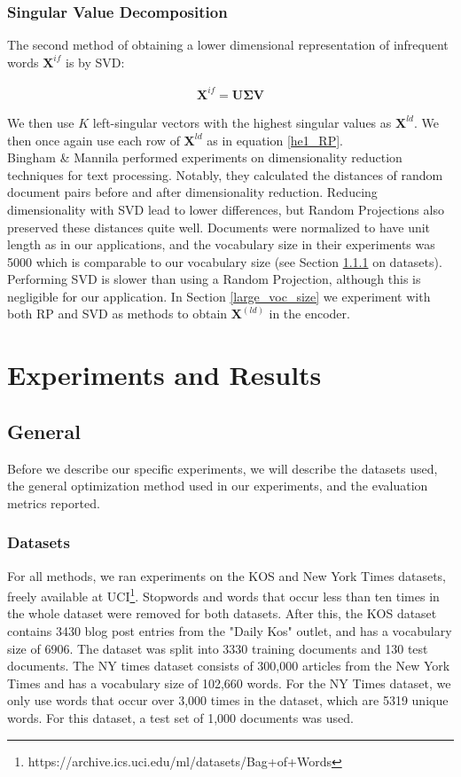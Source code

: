 \documentclass{report}
\begin{document}
\subsection{Singular Value Decomposition}\label{SVD}
The second method of obtaining a lower dimensional representation of infrequent words $\mathbf{X}^{if}$ is by SVD:

\begin{align}
\mathbf{X}^{if} = \mathbf{U\Sigma V}
\end{align}

We then use $K$ left-singular vectors with the highest singular values as $\mathbf{X}^{ld}$. We then once again use each row of $\mathbf{X}^{ld}$ as in equation \ref{he1_RP}.\\
 Bingham \& Mannila \cite{bingham2001random} performed experiments on dimensionality reduction techniques for text processing. Notably, they calculated the distances of random document pairs before and after dimensionality reduction. Reducing dimensionality with SVD lead to lower differences, but Random Projections also preserved these distances quite well. Documents were normalized to have unit length as in our applications, and the vocabulary size in their experiments was 5000 which is comparable to our vocabulary size (see Section \ref{datasets} on datasets). Performing SVD is slower than using a Random Projection, although this is negligible for our application. In Section \ref{large_voc_size} we experiment with both RP and SVD as methods to obtain $\mathbf{X}^{(ld)}$ in the encoder.


\chapter{Experiments and Results}\label{experiments}
\section{General}
Before we describe our specific experiments, we will describe the datasets used, the general optimization method used in our experiments, and the evaluation metrics reported. 
	\subsection{Datasets}\label{datasets}
	For all methods, we ran experiments on the KOS and New York Times datasets, freely available at UCI\footnote{https://archive.ics.uci.edu/ml/datasets/Bag+of+Words}. Stopwords and words that occur less than ten times in the whole dataset were removed for both datasets. After this, the KOS dataset contains 3430 blog post entries from the "Daily Kos" outlet, and has a vocabulary size of 6906. The dataset was split into 3330 training documents and 130 test documents. The NY times dataset consists of 300,000 articles from the New York Times and has a vocabulary size of 102,660 words. For the NY Times dataset, we only use words that occur over 3,000 times in the dataset, which are 5319 unique words. For this dataset, a test set of 1,000 documents was used.
	
\end{document}
